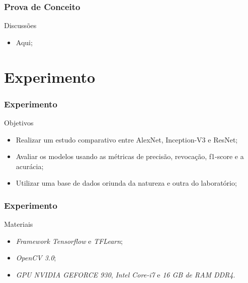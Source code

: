 \documentclass{beamer}
\begin{document}
\begin{frame}
 \frametitle{Prova de Conceito}
 \begin{block}{Discussões}
\begin{itemize}
\pause
\item Aqui;

\end{itemize}
\end{block}
\end{frame}
 
 

\section{Experimento}

\begin{frame}
 \frametitle{Experimento}
\begin{block}{Objetivos}
\begin{itemize}
\pause
\item Realizar um estudo comparativo entre AlexNet, Inception-V3 e ResNet;
\pause
\item Avaliar os modelos usando as métricas de precisão, revocação, f1-score e a acurácia;
\pause
\item Utilizar uma base de dados oriunda da natureza e outra do laboratório;
\end{itemize}
\end{block} 
\end{frame}


\begin{frame}
 \frametitle{Experimento}
\begin{block}{Materiais}
\begin{itemize}
\pause
\item \textit{Framework Tensorflow} e \textit{TFLearn};
\pause
\item \textit{OpenCV 3.0};
\pause
\item \textit{GPU NVIDIA GEFORCE 930}, \textit{Intel Core-i7} e \textit{16 GB de RAM DDR4}.

\end{itemize}
\end{block} 
\end{frame}
\end{document}
